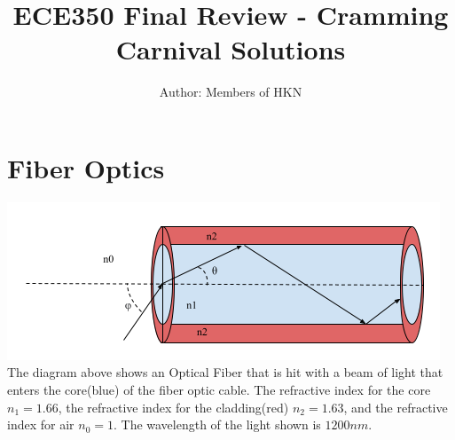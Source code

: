 \documentclass{article}
\title{ECE350 Final Review - Cramming Carnival Solutions}
\author{Author: Members of HKN}
\date{}
\begin{document}
\maketitle

\section{Fiber Optics}
\includegraphics{figures/Optical Fiber Diagram.png}
The diagram above shows an Optical Fiber that is hit with a beam of light that enters the core(blue) of the fiber optic cable. The refractive index for the core $n_{1}=1.66$, the refractive index for the cladding(red) $n_{2}=1.63$, and the refractive index for air $n_{0}=1$. The wavelength of the light shown is $1200 nm$.
\end{document}
